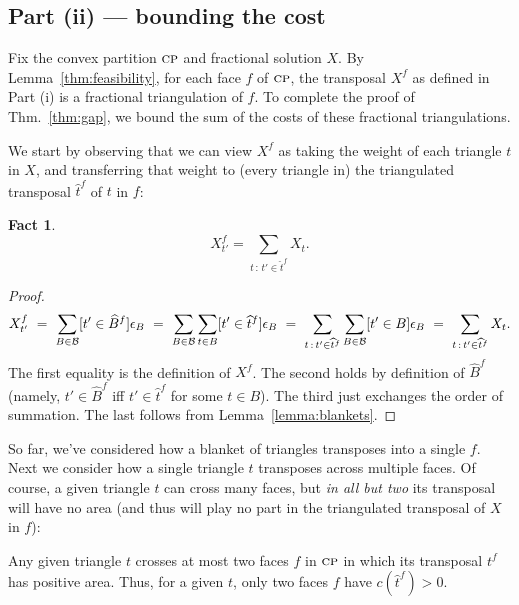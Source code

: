 \documentclass[final]{siamltex}
\newcommand{\transposal}[2]{{#1}^{#2}}
\newcommand{\triangulated}[2]{{\widehat{#1}}^{#2}}
\newcommand{\blanket}{B} \newcommand{\blanketSet}{{\cal B}} \newcommand{\convPart}{\text{\sc cp}}
\newcommand{\cost}{c}
\newcommand{\face}{f}
\newcommand{\tri}{t}  \newcommand{\vertex}{v}
\newcommand{\fracTriang}{X}
\newtheorem{fact}{Fact}[theorem]
\begin{document}
\subsection{Part (ii) --- bounding the cost}
Fix the convex partition $\convPart$ and fractional solution $\fracTriang$.
By Lemma~\ref{thm:feasibility}, for each face $\face$ of $\convPart$,
the transposal $\transposal{\fracTriang}{\face}$ as defined in Part (i)
is a fractional triangulation of $\face$.
To complete the proof of Thm.~\ref{thm:gap},
we bound the sum of the costs of these fractional triangulations.

We start by observing that we can view $\transposal{\fracTriang}{\face}$
as taking the weight of each triangle $\tri$ in $\fracTriang$,
and transferring that weight to (every triangle in) the triangulated transposal 
$\triangulated{\tri}{\face}$ of $\tri$ in $\face$:
\begin{fact}\label{observation:cost}
  \[\transposal{\fracTriang}{\face}_{t'} = \sum_{\tri\,:\, t'\in \triangulated{\tri}{\face}} \fracTriang_\tri.\]
\end{fact}

\begin{proof} 
\[
\transposal{\fracTriang}{\face}_{\tri'}
~=~
\sum_{\blanket\in\blanketSet} [\tri' \in \triangulated{\blanket}{\face}] \epsilon_{\blanket}
~=~
\sum_{\blanket\in\blanketSet} \sum_{\tri\in\blanket} [\tri' \in \triangulated{\tri}{\face}] \epsilon_{\blanket}
~=~
\sum_{\tri\,:\, \tri'\in \triangulated{\tri}{\face}} 
\sum_{\blanket\in\blanketSet} [\tri'\in\blanket] \epsilon_\blanket
~=~
\sum_{\tri\,:\, t'\in \triangulated{\tri}{\face}} \fracTriang_\tri.
\]
The first equality is the definition of $\transposal{\fracTriang}{\face}$.
The second holds by definition of $\triangulated{\blanket}{\face}$
(namely, $\tri'\in \triangulated{\blanket}{\face}$
iff
$\tri'\in \triangulated{\tri}{\face}$ for some $\tri\in\blanket$).
The third just exchanges the order of summation.
The last follows from Lemma~\ref{lemma:blankets}.
\end{proof}

So far, we've considered how a blanket of triangles transposes into a single $\face$.
Next we consider how a single triangle $\tri$ transposes across multiple faces.
Of course, a given triangle $\tri$ can cross many faces,
but {\em in all but two} its transposal will have no area
(and thus will play no part in the triangulated transposal of $\fracTriang$ in $f$):

\begin{lemma}\label{lemma:transposals}
  Any given triangle $\tri$ crosses at most two faces $\face$ in $\convPart$
  in which its transposal $\transposal{\tri}{\face}$ has positive area.
  Thus, for a given $\tri$, only two faces $\face$ have
  $\cost(\triangulated{\tri}{\face})>0$.
\end{lemma}
\end{document}
